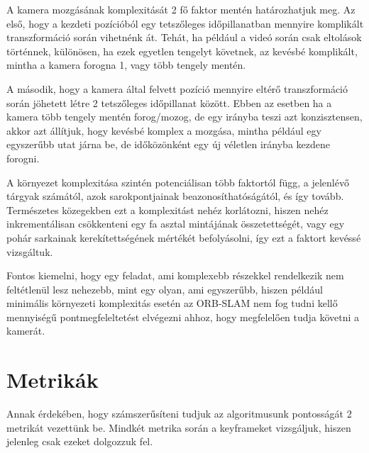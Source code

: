 A kamera mozgásának komplexitását 2 fő faktor mentén határozhatjuk meg.
Az első, hogy a kezdeti pozícióból egy tetszőleges időpillanatban mennyire komplikált transzformáció során vihetnénk át.
Tehát, ha például a videó során csak eltolások történnek, különösen, ha ezek egyetlen tengelyt követnek, az kevésbé komplikált, mintha a kamera forogna 1, vagy több tengely mentén.

A második, hogy a kamera által felvett pozíció mennyire eltérő transzformáció során jöhetett létre 2 tetszőleges időpillanat között.
Ebben az esetben ha a kamera több tengely mentén forog/mozog, de egy irányba teszi azt konzisztensen, akkor azt állítjuk, hogy kevésbé komplex a mozgása, mintha például egy egyszerűbb utat járna be, de időközönként egy új véletlen irányba kezdene forogni.

A környezet komplexitása szintén potenciálisan több faktortól függ, a jelenlévő tárgyak számától, azok sarokpontjainak beazonosíthatóságától, és így tovább.
Természetes közegekben ezt a komplexitást nehéz korlátozni, hiszen nehéz inkrementálisan csökkenteni egy fa asztal mintájának összetettségét, vagy egy pohár sarkainak kerekítettségének mértékét befolyásolni, így ezt a faktort kevéssé vizsgáltuk.

Fontos kiemelni, hogy egy feladat, ami komplexebb részekkel rendelkezik nem feltétlenül lesz nehezebb, mint egy olyan, ami egyszerűbb, hiszen például minimális környezeti komplexitás esetén az ORB-SLAM nem fog tudni kellő mennyiségű pontmegfeleltetést elvégezni ahhoz, hogy megfelelően tudja követni a kamerát.

\section{Metrikák}

Annak érdekében, hogy számszerűsíteni tudjuk az algoritmusunk pontosságát 2 metrikát vezettünk be.
Mindkét metrika során a keyframeket vizsgáljuk, hiszen jelenleg csak ezeket dolgozzuk fel.

